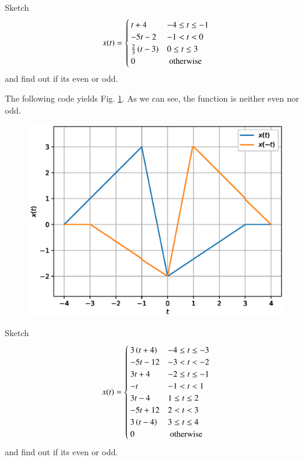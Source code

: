 \documentclass[journal,12pt,twocolumn]{IEEEtran}
\begin{document}
\begin{problem}
Sketch 
\begin{equation}
x(t) = 
\begin{cases}
t + 4 & -4 \leq t \leq -1 \\
-5t-2 & -1 < t < 0 \\
\frac{2}{3}\left(t-3\right) & 0 \leq t \leq 3 \\
0 & \text{ otherwise }
\end{cases}
\end{equation}
%
and find out if its even or odd.
\end{problem}
\solution The following code yields Fig. \ref{fig_4b}. As we can see, the function is neither even nor odd.

\begin{figure}[!h]
\begin{center}
\includegraphics[width=\columnwidth]{./figs/4b}
\end{center}
\label{fig_4b}	
\end{figure}
%
\begin{problem}
Sketch 
\begin{equation}
x(t) = 
\begin{cases}
3\left(t + 4\right) & -4 \leq t \leq -3 \\
-5t-12 & -3 < t < -2 \\
3t+4 & -2 \leq t \leq -1 \\
-t & -1 < t < 1 \\
3t-4 & 1 \le t \le 2 \\
-5t+12 & 2 < t < 3 \\
3\left(t-4\right) & 3 \le t \le 4 \\
0 & \text{ otherwise }
\end{cases}
\end{equation}
%
and find out if its even or odd.
\end{problem}
\end{document}
